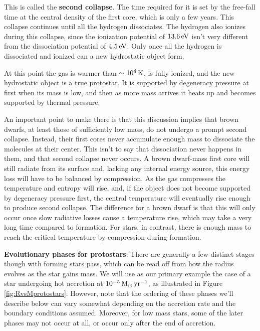 \documentclass[a4paper,10pt]{article}
\begin{document}
{\noindent}This is called the \textbf{second collapse}. The time required for it is set by the free-fall time at the central density of the first core, which is only a few years. This collapse continues until all the hydrogen dissociates. The hydrogen also ionizes during this collapse, since the ionization potential of $13.6\,{\rm eV}$ isn't very different from the dissociation potential of $4.5\,{\rm eV}$. Only once all the hydrogen is dissociated and ionized can a new hydrostatic object form.

{\noindent}At this point the gas is warmer than $\sim10^4\,{\rm K}$, is fully ionized, and the new hydrostatic object is a true protostar. It is supported by degeneracy pressure at first when its mass is low, and then as more mass arrives it heats up and becomes supported by thermal pressure.

{\noindent}An important point to make there is that this discussion implies that brown dwarfs, at least those of sufficiently low mass, do not undergo a prompt second collapse. Instead, their first cores never accumulate enough mass to dissociate the molecules at their center. This isn't to say that dissociation never happens in them, and that second collapse never occurs. A brown dwarf-mass first core will still radiate from its surface and, lacking any internal energy source, this energy loss will have to be balanced by compression. As the gas compresses the temperature and entropy will rise, and, if the object does not become supported by degeneracy pressure first, the central temperature will eventually rise enough to produce second collapse. The difference for a brown dwarf is that this will only occur once slow radiative losses cause a temperature rise, which may take a very long time compared to formation. For stars, in contrast, there is enough mass to reach the critical temperature by compression during formation.

{\noindent}\textbf{Evolutionary phases for protostars}: There are generally a few distinct stages though with forming stars pass, which can be read off from how the radius evolves as the star gains mass. We will use as our primary example the case of a star undergoing hot accretion at $10^{-5}\,{\rm M_\odot\,yr^{-1}}$, as illustrated in Figure \ref{fig:RvsMprotostars}. However, note that the ordering of these phases we'll describe below can vary somewhat depending on the accretion rate and the boundary conditions assumed. Moreover, for low mass stars, some of the later phases may not occur at all, or occur only after the end of accretion.
\end{document}
